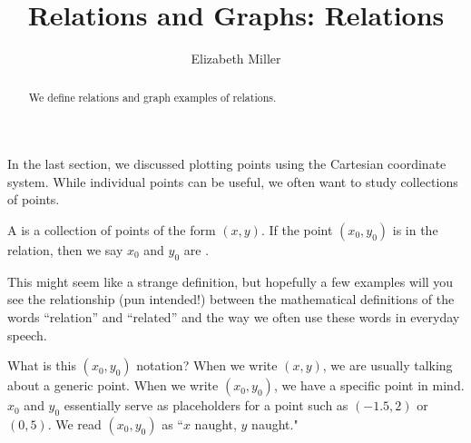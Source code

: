 \documentclass[nooutcomes]{ximera}
\author{Elizabeth Miller}
\title{Relations and Graphs: Relations}
\begin{document}
\begin{abstract}
We define relations and graph examples of relations. 
\end{abstract}
\maketitle


In the last section, we discussed plotting points using the Cartesian coordinate system. While individual points can be useful, we often want to study collections of points.

\begin{definition}
A  is a collection of points of the form $(x,y)$.  If the point $(x_0,y_0)$ is in the relation, then we say $x_0$ and $y_0$ are .
\end{definition}

This might seem like a strange definition, but hopefully a few
examples will you see the relationship (pun intended!) between the
mathematical definitions of the words ``relation'' and ``related'' and the
way we often use these words in everyday speech.

\begin{MM}
What is this $(x_0,y_0)$ notation?  When we write $(x,y)$, we are usually talking about a generic point.  When we write $(x_0,y_0)$, we have a specific point in mind.  $x_0$ and $y_0$ essentially serve as placeholders for a point such as $(-1.5, 2)$ or $(0,5)$. We read $(x_0,y_0)$ as ``$x$ naught, $y$ naught."
\end{MM}
\end{document}
